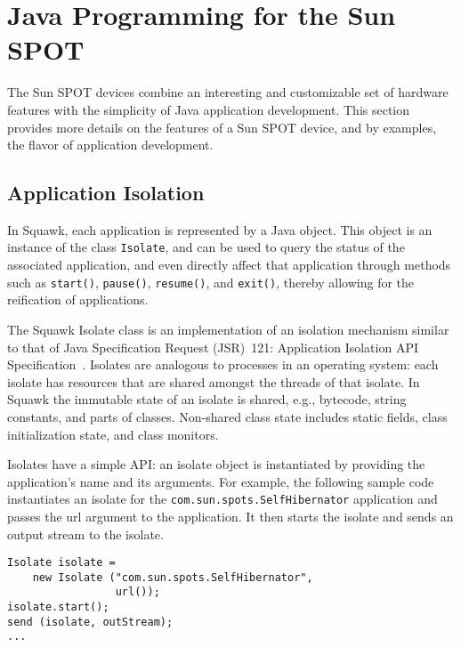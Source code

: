 \documentclass{sigplanconf}
\begin{document}
\section{Java Programming for the Sun SPOT}
\label{sec-sunspot}

The Sun SPOT devices combine an interesting and customizable set of
hardware features with the simplicity of Java application development. 
This section provides more details on the features of a Sun SPOT device, and 
by examples, the flavor of application development.



\subsection{Application Isolation}
\label{sec-isolates}

In Squawk, each application is represented by a Java object. 
This object is an instance of the class {\tt Isolate}, and can be 
used to query the status of the associated application, and
even directly affect that application through methods 
such as \texttt{start()}, \texttt{pause()}, \texttt{resume()}, and 
\texttt{exit()}, thereby allowing for the reification of applications.  

The Squawk Isolate class is an implementation of an isolation 
mechanism similar to that of Java Specification Request (JSR)~121: 
Application Isolation API Specification~\cite{JSR121,Czaj00}. 
Isolates are analogous to processes in an operating system: 
each isolate has resources that are shared amongst the 
threads of that isolate.  
In Squawk the immutable state of an isolate is shared, e.g.,
bytecode, string constants, and parts of classes. 
Non-shared class state includes static fields, class initialization
state, and class monitors. 

Isolates have a simple API: an isolate object is instantiated 
by providing the application's name and its arguments.  
For example, the following sample code instantiates an 
isolate for the \texttt{com.sun.spots.SelfHibernator} 
application and passes the url argument to the application. 
It then starts the isolate and sends an output stream to 
the isolate.

\begin{verbatim}
Isolate isolate = 
    new Isolate ("com.sun.spots.SelfHibernator", 
                 url());
isolate.start();
send (isolate, outStream);
...
\end{verbatim}
\end{document}
